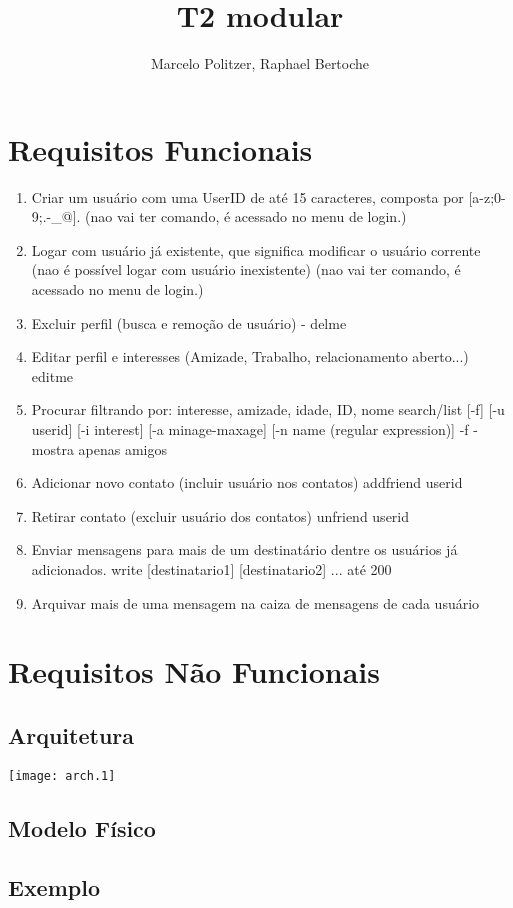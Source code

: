\documentclass[a4paper,12pt]{article}
\title{T2 modular}
\author{Marcelo Politzer, Raphael Bertoche}
\begin{document}
\maketitle

\section{Requisitos Funcionais}

\begin{enumerate}
\item Criar um usuário com uma UserID de até 15 caracteres, composta por [a-z;0-9;.-\_@].
  (nao vai ter comando, é acessado no menu de login.)

\item Logar com usuário já existente, que significa modificar o usuário corrente (nao é possível logar com usuário inexistente)
  (nao vai ter comando, é acessado no menu de login.)

\item Excluir perfil (busca e remoção de usuário) - delme

\item Editar perfil e interesses (Amizade, Trabalho, relacionamento aberto...)
  editme

\item Procurar filtrando por: interesse, amizade, idade, ID, nome
  search/list [-f] [-u userid] [-i interest] [-a minage-maxage] [-n name (regular expression)]
    -f - mostra apenas amigos

\item Adicionar novo contato (incluir usuário nos contatos)
  addfriend userid

\item Retirar contato (excluir usuário dos contatos)
  unfriend userid

\item Enviar mensagens para mais de um destinatário dentre os usuários já adicionados.
  write [destinatario1] [destinatario2] ... até 200

\item Arquivar mais de uma mensagem na caiza de mensagens de cada usuário

\end{enumerate}

\section{Requisitos Não Funcionais}

\subsection{Arquitetura}
\texttt{[image: arch.1]}

\subsection{Modelo Físico}

\subsection{Exemplo}
\end{document}
